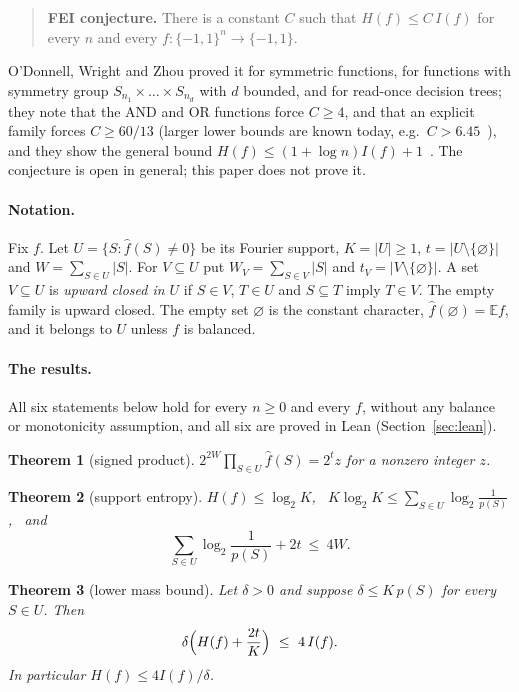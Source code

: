 \documentclass[11pt]{article}
\newtheorem{theorem}{Theorem}
\theoremstyle{definition}
\theoremstyle{remark}
\renewcommand{\lg}{\log_2}
\begin{document}
\begin{quote}
\textbf{FEI conjecture.} There is a constant $C$ such that $H(f)\le C\,I(f)$
for every $n$ and every $f:\{-1,1\}^n\to\{-1,1\}$.
\end{quote}

\noindent O'Donnell, Wright and Zhou proved it for symmetric functions, for
functions with symmetry group $S_{n_1}\times\dots\times S_{n_d}$ with $d$
bounded, and for read-once decision trees; they note that the AND and OR
functions force $C\ge4$, and that an explicit family forces $C\ge60/13$
(larger lower bounds are known today, e.g.\ $C>6.45$~\cite{hod}), and
they show the general bound $H(f)\le(1+\log n)I(f)+1$~\cite[Section~1]{owz}.
The conjecture is open in general; this paper does not prove it.

\paragraph{Notation.} Fix $f$. Let $U=\{S:\hat f(S)\ne0\}$ be its Fourier
support, $K=|U|\ge1$, $t=|U\setminus\{\varnothing\}|$ and
$W=\sum_{S\in U}|S|$. For $V\subseteq U$ put $W_V=\sum_{S\in V}|S|$ and
$t_V=|V\setminus\{\varnothing\}|$. A set $V\subseteq U$ is \emph{upward closed
in $U$} if $S\in V$, $T\in U$ and $S\subseteq T$ imply $T\in V$. The empty
family is upward closed. The empty set $\varnothing$ is the constant character,
$\hat f(\varnothing)=\mathbb E f$, and it belongs to $U$ unless $f$ is balanced.

\paragraph{The results.} All six statements below hold for every $n\ge0$ and
every $f$, without any balance or monotonicity assumption, and all six are
proved in Lean (Section~\ref{sec:lean}).

\begin{theorem}[signed product]\label{thm:prod}
$2^{2W}\prod_{S\in U}\hat f(S)=2^t z$ for a nonzero integer $z$.
\end{theorem}

\begin{theorem}[support entropy]\label{thm:supp}
$H(f)\le\lg K$, \ $K\lg K\le\sum_{S\in U}\lg\frac1{p(S)}$, \ and
\[
\sum_{S\in U}\lg\frac1{p(S)}+2t\ \le\ 4W .
\]
\end{theorem}

\begin{theorem}[lower mass bound]\label{thm:lower}
Let $\delta>0$ and suppose $\delta\le K\,p(S)$ for every $S\in U$. Then
\[
\delta\Bigl(H(f)+\frac{2t}{K}\Bigr)\ \le\ 4\,I(f).
\]
In particular $H(f)\le4I(f)/\delta$.
\end{theorem}
\end{document}
